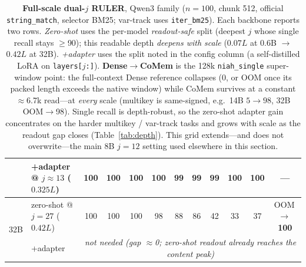 \begin{table}[t]
{\begin{tabular}{@{}llcccccccccc@{}}
  & +adapter @ $j{\approx}13$ ($0.325L$) & 100 & 100 & 100 & \textbf{100} & \textbf{99} & \textbf{99} & \textbf{99} & \textbf{100} & \textbf{100} & --- \\
\midrule
\multirow{2}{*}{32B}
  & zero-shot @ $j{=}27$ ($0.42L$) & 100 & 100 & 100 & 98 & 88 & 86 & 42 & 33 & 37 & OOM\,$\to$\,\textbf{100} \\
  & +adapter                        & \multicolumn{10}{c}{\emph{not needed (gap $\approx$0; zero-shot readout already reaches the content peak)}} \\
\bottomrule
\end{tabular}%
}
\caption{\textbf{Full-scale dual-$j$ RULER}, Qwen3 family ($n{=}100$, chunk 512,
official \texttt{string\_match}, selector BM25; var-track uses \texttt{iter\_bm25}).
Each backbone reports two rows. \emph{Zero-shot} uses the per-model
\emph{readout-safe} split (deepest $j$ whose single recall stays $\ge$90); this
readable depth \emph{deepens with scale} ($0.07L$ at 0.6B $\to$ $0.42L$ at 32B).
\emph{+adapter} uses the split noted in the config column (a self-distilled LoRA
on \texttt{layers[$j$:]}). \textbf{Dense$\to$CoMem} is the 128k
\texttt{niah\_single} super-window point: the full-context Dense reference
collapses (0, or OOM once its packed length exceeds the native window) while
CoMem survives at a constant $\approx$6.7k read---at \emph{every} scale (multikey
is same-signed, e.g.\ 14B $5{\to}98$, 32B OOM$\to$98). Single recall is depth-robust,
so the zero-shot adapter gain concentrates on the harder multikey / var-track
tasks and grows with scale as the readout gap closes (Table~\ref{tab:depth}).
This grid extends---and does not overwrite---the main 8B $j{=}12$ setting used
elsewhere in this section.}
\label{tab:scale}
\end{table}
